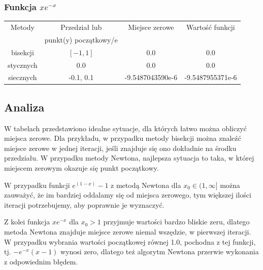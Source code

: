 \documentclass[12pt]{article}
\begin{document}
\subsubsection{Funkcja $xe^{-x}$}
\begin{center}
\begin{tabular}{ |c|c|c|c| }
\hline
Metody & Przedział lub & Miejsce zerowe & Wartość funkcji\\ 
 & punkt(y) początkowy/e & & \\ \hline
bisekcji & $[-1, 1]$ & 0.0 & 0.0\\
stycznych & 0.0 & 0.0 & 0.0\\
siecznych & -0.1, 0.1 & -9.5487043590e-6 & -9.5487955371e-6\\ \hline
\end{tabular}
\end{center}
 
\subsection{Analiza}
W tabelach przedstawiono idealne sytuacje, dla których łatwo można obliczyć miejsca zerowe. Dla przykładu, w przypadku metody bisekcji można znaleźć miejsce zerowe w jednej iteracji, jeśli znajduje się ono dokładnie na środku przedziału. W przypadku metody Newtona, najlepsza sytuacja to taka, w której 
miejscem zerowym okazuje się punkt początkowy.

W przypadku funkcji $e^{(1-x)}-1$ z metodą Newtona dla $x_0 \in (1, \infty]$ można zauważyć, że im bardziej oddalamy się od miejsca zerowego, tym większej ilości iteracji potrzebujemy, aby poprawnie je wyznaczyć.

Z kolei funkcja  $xe^{-x}$ dla $x_0>1$ przyjmuje wartości bardzo bliskie zeru, dlatego metoda Newtona znajduje miejsce zerowe niemal wszędzie, w pierwszej iteracji. W przypadku wybrania wartości początkowej równej 1.0, pochodna z tej funkcji, tj. $-e^{-x}(x-1)$ wynosi zero, dlatego też algorytm Newtona przerwie wykonania z odpowiednim błędem. 
\end{document}
